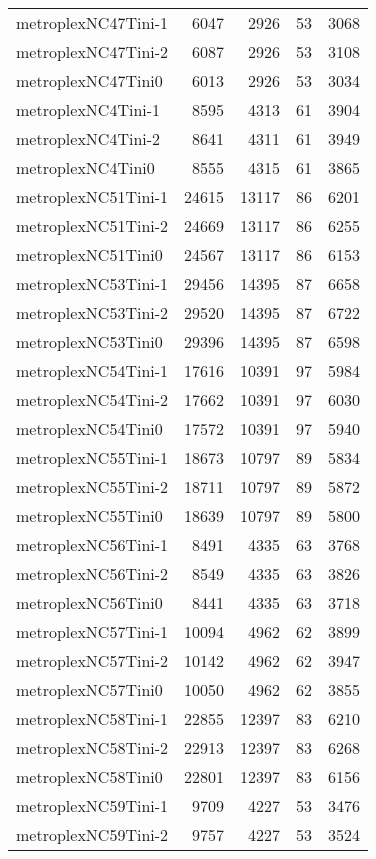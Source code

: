\begin{longtable}{lrrrr}
metroplexNC47Tini-1 & 6047 & 2926 & 53 & 3068 \\
metroplexNC47Tini-2 & 6087 & 2926 & 53 & 3108 \\
metroplexNC47Tini0 & 6013 & 2926 & 53 & 3034 \\
metroplexNC4Tini-1 & 8595 & 4313 & 61 & 3904 \\
metroplexNC4Tini-2 & 8641 & 4311 & 61 & 3949 \\
metroplexNC4Tini0 & 8555 & 4315 & 61 & 3865 \\
metroplexNC51Tini-1 & 24615 & 13117 & 86 & 6201 \\
metroplexNC51Tini-2 & 24669 & 13117 & 86 & 6255 \\
metroplexNC51Tini0 & 24567 & 13117 & 86 & 6153 \\
metroplexNC53Tini-1 & 29456 & 14395 & 87 & 6658 \\
metroplexNC53Tini-2 & 29520 & 14395 & 87 & 6722 \\
metroplexNC53Tini0 & 29396 & 14395 & 87 & 6598 \\
metroplexNC54Tini-1 & 17616 & 10391 & 97 & 5984 \\
metroplexNC54Tini-2 & 17662 & 10391 & 97 & 6030 \\
metroplexNC54Tini0 & 17572 & 10391 & 97 & 5940 \\
metroplexNC55Tini-1 & 18673 & 10797 & 89 & 5834 \\
metroplexNC55Tini-2 & 18711 & 10797 & 89 & 5872 \\
metroplexNC55Tini0 & 18639 & 10797 & 89 & 5800 \\
metroplexNC56Tini-1 & 8491 & 4335 & 63 & 3768 \\
metroplexNC56Tini-2 & 8549 & 4335 & 63 & 3826 \\
metroplexNC56Tini0 & 8441 & 4335 & 63 & 3718 \\
metroplexNC57Tini-1 & 10094 & 4962 & 62 & 3899 \\
metroplexNC57Tini-2 & 10142 & 4962 & 62 & 3947 \\
metroplexNC57Tini0 & 10050 & 4962 & 62 & 3855 \\
metroplexNC58Tini-1 & 22855 & 12397 & 83 & 6210 \\
metroplexNC58Tini-2 & 22913 & 12397 & 83 & 6268 \\
metroplexNC58Tini0 & 22801 & 12397 & 83 & 6156 \\
metroplexNC59Tini-1 & 9709 & 4227 & 53 & 3476 \\
metroplexNC59Tini-2 & 9757 & 4227 & 53 & 3524 \\

\end{longtable}
